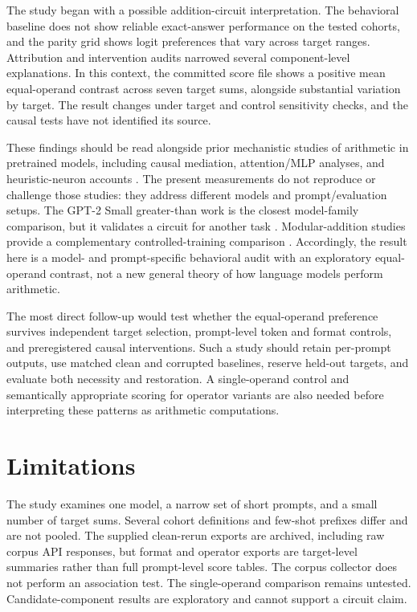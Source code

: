 \documentclass[11pt]{article}
\begin{document}
The study began with a possible addition-circuit interpretation. The behavioral baseline does not show reliable exact-answer performance on the tested cohorts, and the parity grid shows logit preferences that vary across target ranges. Attribution and intervention audits narrowed several component-level explanations. In this context, the committed score file shows a positive mean equal-operand contrast across seven target sums, alongside substantial variation by target. The result changes under target and control sensitivity checks, and the causal tests have not identified its source.

These findings should be read alongside prior mechanistic studies of arithmetic in pretrained models, including causal mediation, attention/MLP analyses, and heuristic-neuron accounts \cite{stolfo2023causal,yu2024cna,nikankin2025heuristics}. The present measurements do not reproduce or challenge those studies: they address different models and prompt/evaluation setups. The GPT-2 Small greater-than work is the closest model-family comparison, but it validates a circuit for another task \cite{hanna2023greater}. Modular-addition studies provide a complementary controlled-training comparison \cite{nanda2023progress,zhong2023clock}. Accordingly, the result here is a model- and prompt-specific behavioral audit with an exploratory equal-operand contrast, not a new general theory of how language models perform arithmetic.

The most direct follow-up would test whether the equal-operand preference survives independent target selection, prompt-level token and format controls, and preregistered causal interventions. Such a study should retain per-prompt outputs, use matched clean and corrupted baselines, reserve held-out targets, and evaluate both necessity and restoration. A single-operand control and semantically appropriate scoring for operator variants are also needed before interpreting these patterns as arithmetic computations.

\section{Limitations}

The study examines one model, a narrow set of short prompts, and a small number of target sums. Several cohort definitions and few-shot prefixes differ and are not pooled. The supplied clean-rerun exports are archived, including raw corpus API responses, but format and operator exports are target-level summaries rather than full prompt-level score tables. The corpus collector does not perform an association test. The single-operand comparison remains untested. Candidate-component results are exploratory and cannot support a circuit claim.
\end{document}
